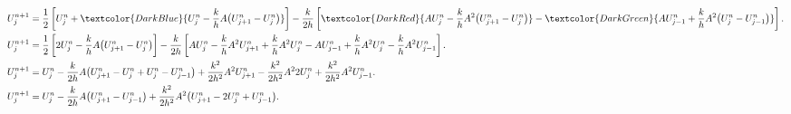 \begin{frame}
  \frametitle{\secname}

  \begin{proofs}
    \begin{align*}
      U^{n+1}_{j} & =
      \frac{1}{2}
      \left[
        U^{n}_{j}+
        \textcolor{DarkBlue}{
          U_{j}^{n}-
          \frac{k}{h}A
          \big(
          U^{n}_{j+1}-
          U^{n}_{j}
          \big)}
        \right]-
      \frac{k}{2h}
      \left[
      \textcolor{DarkRed}{
      AU_{j}^{n}-
      \frac{k}{h}A^{2}
      \big(
      U^{n}_{j+1}-
      U^{n}_{j}
      \big)}-
      \textcolor{DarkGreen}{
      AU^{n}_{j-1}+
      \frac{k}{h}A^{2}
      \big(
      U^{n}_{j}-
      U^{n}_{j-1}
      \big)}
      \right].          \\
      U^{n+1}_{j} & =
      \frac{1}{2}
      \left[
        2U^{n}_{j}-
        \frac{k}{h}A
        \big(
        U^{n}_{j+1}-
        U^{n}_{j}
        \big)
        \right]-
      \frac{k}{2h}
      \left[
      AU_{j}^{n}
      -\frac{k}{h}
      A^{2}U^{n}_{j+1}+
      \frac{k}{h}
      A^{2}U^{n}_{j}-
      AU^{n}_{j-1}+
      \frac{k}{h}A^{2}
      U^{n}_{j}-
      \frac{k}{h}A^{2}
      U^{n}_{j-1}
      \right].          \\
      U^{n+1}_{j} & =
      U_{j}^{n}-
      \frac{k}{2h}
      A
      \big(
      U^{n}_{j+1}-
      U^{n}_{j}+
      U^{n}_{j}-
      U^{n}_{j-1}
      \big)+
      \frac{k^{2}}{2h^{2}}
      A^{2}U^{n}_{j+1}-
      \frac{k^{2}}{2h^{2}}
      A^{2}2U^{n}_{j}+
      \frac{k^{2}}{2h^{2}}
      A^{2}U^{n}_{j-1}. \\
      U^{n+1}_{j} & =
      U_{j}^{n}-
      \frac{k}{2h}
      A
      \big(
      U^{n}_{j+1}-
      U^{n}_{j-1}
      \big)+
      \frac{k^{2}}{2h^{2}}
      A^{2}
      \big(
      U^{n}_{j+1}-
      2U^{n}_{j}+
      U^{n}_{j-1}
      \big).
    \end{align*}
  \end{proofs}
\end{frame}

